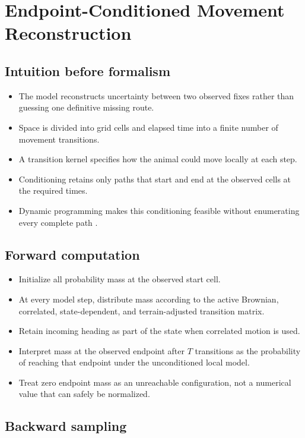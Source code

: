 \chapter{Endpoint-Conditioned Movement Reconstruction}
\label{chap:interpolation}

\section{Intuition before formalism}

\begin{itemize}
  \item The model reconstructs uncertainty between two observed fixes rather than guessing one definitive missing route.
  \item Space is divided into grid cells and elapsed time into a finite number of movement transitions.
  \item A transition kernel specifies how the animal could move locally at each step.
  \item Conditioning retains only paths that start and end at the observed cells at the required times.
  \item Dynamic programming makes this conditioning feasible without enumerating every complete path \parencite{buchin2024randomwalks,hagedoornPhD}.
\end{itemize}

\section{Forward computation}

\begin{itemize}
  \item Initialize all probability mass at the observed start cell.
  \item At every model step, distribute mass according to the active Brownian, correlated, state-dependent, and terrain-adjusted transition matrix.
  \item Retain incoming heading as part of the state when correlated motion is used.
  \item Interpret mass at the observed endpoint after $T$ transitions as the probability of reaching that endpoint under the unconditioned local model.
  \item Treat zero endpoint mass as an unreachable configuration, not a numerical value that can safely be normalized.
\end{itemize}

\section{Backward sampling}

